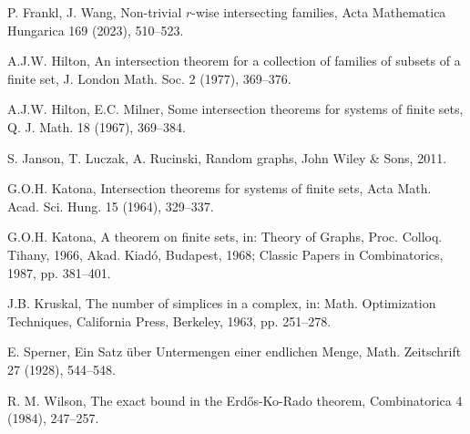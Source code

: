 \documentclass[11pt,a4paper]{article}
\newtheorem{false statement}{False statement}
\theoremstyle{definition}
\begin{document}
\begin{thebibliography}{10}
 P. Frankl, J. Wang, Non-trivial $r$-wise intersecting families,  Acta Mathematica Hungarica  169 (2023),  510--523.

A.J.W. Hilton, An intersection theorem for a collection of families of subsets of  a finite set, J. London Math. Soc. 2 (1977), 369--376.

 A.J.W. Hilton, E.C. Milner, Some intersection theorems for systems of finite sets, Q. J. Math. 18  (1967), 369--384.

S. Janson, T. Luczak, A. Rucinski, Random graphs, John Wiley \& Sons, 2011.

G.O.H. Katona, Intersection theorems for systems of finite sets, Acta Math. Acad. Sci. Hung. 15 (1964), 329--337.

G.O.H. Katona, A theorem on finite sets, in: Theory of Graphs, Proc. Colloq. Tihany, 1966, Akad.
Kiad\'{o}, Budapest, 1968; Classic Papers in Combinatorics, 1987, pp. 381--401.

J.B. Kruskal, The number of simplices in a complex, in: Math. Optimization Techniques, California Press, Berkeley, 1963, pp. 251--278.

E. Sperner, Ein Satz \"{u}ber Untermengen einer endlichen Menge, Math. Zeitschrift 27 (1928), 544--548.


R. M. Wilson, The exact bound in the Erd\H{o}s-Ko-Rado theorem, Combinatorica 4 (1984), 247--257.

\end{thebibliography}
\end{document}
